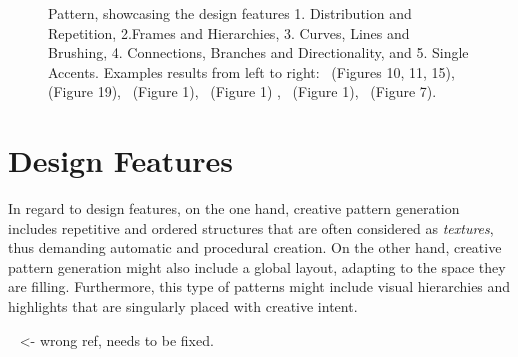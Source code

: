 


\begin{figure}
    \centering
        \caption{\label{fig:design_features}Pattern, showcasing the design features 1. Distribution and Repetition, 2.Frames and Hierarchies, 3. Curves, Lines and Brushing, 4. Connections, Branches and Directionality, and 5. Single Accents. Examples results from left to right:~\cite{loi_2017_pae} (Figures 10, 11, 15)\color{red}{Status rights: not started},\color{black}~\cite{lu_2014_dds} (Figure 19),~\cite{jacobs_2018_dbe} (Figure 1),~\cite{guo_2020_ipm} (Figure 1) \color{orange}{Status rights: invoice received},~\cite{saputra_2017_ffo} (Figure 1),\color{black}~\cite{gieseke_2017_ooo} (Figure 7).}
\end{figure}


\section{Design Features}\label{sec:design}
In regard to design features, on the one hand, creative pattern generation includes repetitive and ordered structures that are often considered as \textit{textures}, thus demanding automatic and procedural creation. On the other hand, creative pattern generation might also include a global layout, adapting to the space they are filling. Furthermore, this type of patterns might include visual hierarchies and highlights that are singularly placed with creative intent. 

  ~ <- wrong ref, needs to be fixed. 


